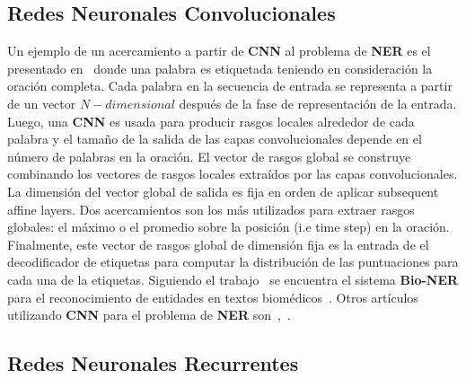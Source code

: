 \subsection{Redes Neuronales Convolucionales}

Un ejemplo de un acercamiento a partir de \textbf{CNN} al problema de \textbf{NER} es el presentado en~\cite{collobert2011natural} donde una palabra es etiquetada teniendo en consideraci\'on la oraci\'on completa. Cada palabra en la secuencia de entrada se representa a partir de un vector $N-dimensional$ despu\'es de la fase de representaci\'on de la entrada. Luego, una \textbf{CNN} es usada para producir rasgos locales alrededor de cada palabra y el tama\~no de la salida de las capas convolucionales depende en el n\'umero de palabras en la oraci\'on. El vector de rasgos global se construye combinando los vectores de rasgos locales extra\'idos por las capas convolucionales. La dimensi\'on del vector global de salida es fija en orden de aplicar subsequent affine layers. Dos acercamientos son los m\'as utilizados para extraer rasgos globales: el m\'aximo o el promedio sobre la posici\'on (i.e time step) en la oraci\'on. Finalmente, este vector de rasgos global de dimensi\'on fija es la entrada de el decodificador de etiquetas para computar la distribuci\'on de las puntuaciones para cada una de la etiquetas. Siguiendo el trabajo~\cite{collobert2011natural} se encuentra el sistema \textbf{Bio-NER} para el reconocimiento de entidades en textos biom\'edicos~\cite{yao2015biomedical}. Otros art\'iculos utilizando \textbf{CNN} para el problema de \textbf{NER} son~\cite{strubell2017fast},~\cite{zhou2017joint}.

\subsection{Redes Neuronales Recurrentes}


